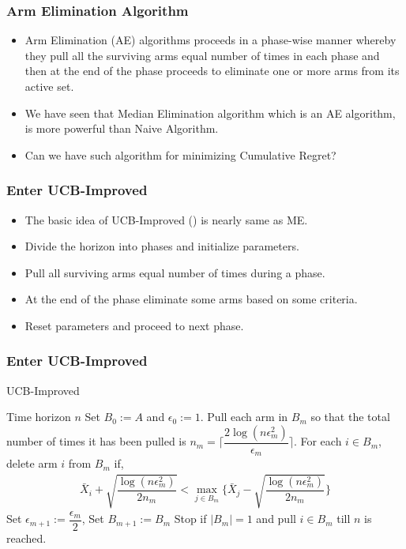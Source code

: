 \begin{frame}
\frametitle{Arm Elimination Algorithm}
\begin{itemize}
\item<1-> Arm Elimination (AE) algorithms proceeds in a phase-wise manner whereby they pull all the surviving arms equal number of times in each phase and then at the end of the phase proceeds to eliminate one or more arms from its active set. 
\item<2-> We have seen that Median Elimination algorithm which is an AE algorithm, is more powerful than Naive Algorithm.
\item<3-> Can we have such algorithm for minimizing Cumulative Regret?
\end{itemize}
\end{frame}

\begin{frame}
\frametitle{Enter UCB-Improved}
\begin{itemize}
\item<1-> The basic idea of UCB-Improved (\cite{auer2010ucb}) is nearly same as ME.
\item<2-> Divide the horizon into phases and initialize parameters.
\item<3-> Pull all surviving arms equal number of times during a phase.
\item<4-> At the end of the phase eliminate some arms based on some criteria.
\item<5-> Reset parameters and proceed to next phase.
\end{itemize}
\end{frame}

\begin{frame}
\frametitle{Enter UCB-Improved}
\begin{algorithm}[H]
\caption{UCB-Improved}
\begin{algorithmic}[1]
 Time horizon $n$
 Set $B_{0}:=A$ and $\epsilon_{0}:=1$.
\State Pull each arm in $B_m$ so that the total number of times it has been pulled is $n_{m}=\bigg\lceil\dfrac{2\log{( n\epsilon_{m}^{2})}}{\epsilon_{m}}\bigg\rceil$. 
\ArmElim
\State For each $i \in B_{m}$, delete arm ${i}$ from $B_{m}$ if,
\begin{align*}
\bar{X}_{i} + \sqrt{\dfrac{\log{(n\epsilon_{m}^{2})}}{2 n_{m}}}  < \max_{{j}\in B_{m}}\bigg\lbrace\bar{X}_{j} -\sqrt{\dfrac{\log{( n\epsilon_{m}^{2})}}{2 n_{m}}} \bigg\rbrace
\end{align*}
\EndArmElim
\ResParam
\State Set $\epsilon_{m+1}:=\dfrac{\epsilon_{m}}{2}$, Set $B_{m+1}:=B_{m}$
\EndResParam
\State Stop if $|B_{m}|=1$ and pull ${i}\in B_{m}$ till $n$ is reached.
\EndFor
\end{algorithmic}
\end{algorithm}
\end{frame}

